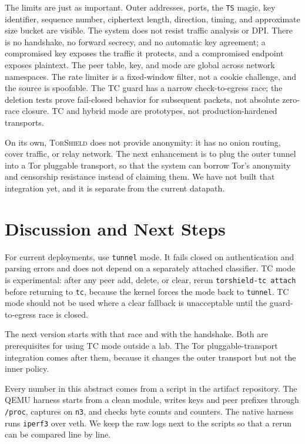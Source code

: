 \documentclass[conference]{IEEEtran}
\newcommand{\sys}{\textsc{TorShield}}
\newcommand{\code}[1]{\texttt{#1}}
\begin{document}
The limits are just as important. Outer addresses, ports, the \code{TS} magic, key identifier, sequence number, ciphertext length, direction, timing, and approximate size bucket are visible. The system does not resist traffic analysis or DPI. There is no handshake, no forward secrecy, and no automatic key agreement; a compromised key exposes the traffic it protects, and a compromised endpoint exposes plaintext. The peer table, key, and mode are global across network namespaces. The rate limiter is a fixed-window filter, not a cookie challenge, and the source is spoofable. The TC guard has a narrow check-to-egress race; the deletion tests prove fail-closed behavior for subsequent packets, not absolute zero-race closure. TC and hybrid mode are prototypes, not production-hardened transports.

On its own, \sys{} does not provide anonymity: it has no onion routing, cover traffic, or relay network. The next enhancement is to plug the outer tunnel into a Tor pluggable transport, so that the system can borrow Tor's anonymity and censorship resistance instead of claiming them. We have not built that integration yet, and it is separate from the current datapath.

\section{Discussion and Next Steps}
For current deployments, use \code{tunnel} mode. It fails closed on authentication and parsing errors and does not depend on a separately attached classifier. TC mode is experimental: after any peer add, delete, or clear, rerun \code{torshield-tc attach} before returning to \code{tc}, because the kernel forces the mode back to \code{tunnel}. TC mode should not be used where a clear fallback is unacceptable until the guard-to-egress race is closed.

The next version starts with that race and with the handshake. Both are prerequisites for using TC mode outside a lab. The Tor pluggable-transport integration comes after them, because it changes the outer transport but not the inner policy.

Every number in this abstract comes from a script in the artifact repository. The QEMU harness starts from a clean module, writes keys and peer prefixes through \code{/proc}, captures on \code{n3}, and checks byte counts and counters. The native harness runs \code{iperf3} over veth. We keep the raw logs next to the scripts so that a rerun can be compared line by line.
\end{document}
